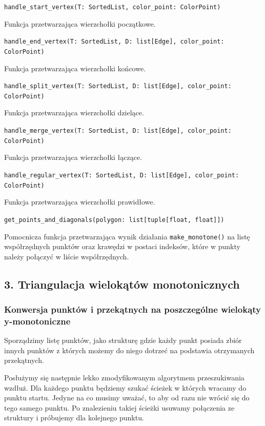 \documentclass[12pt]{article}
\begin{document}
\verb|handle_start_vertex(T: SortedList, color_point: ColorPoint)|

Funkcja przetwarzająca wierzchołki początkowe.
\mbox{}\newline

\verb|handle_end_vertex(T: SortedList, D: list[Edge], color_point: ColorPoint)|

Funkcja przetwarzająca wierzchołki końcowe.
\mbox{}\newline

\verb|handle_split_vertex(T: SortedList, D: list[Edge], color_point: ColorPoint)|

Funkcja przetwarzająca wierzchołki dzielące.
\mbox{}\newline

\verb|handle_merge_vertex(T: SortedList, D: list[Edge], color_point: ColorPoint)|

Funkcja przetwarzająca wierzchołki łączące.
\mbox{}\newline

\verb|handle_regular_vertex(T: SortedList, D: list[Edge], color_point: ColorPoint)|

Funkcja przetwarzająca wierzchołki prawidłowe.
\mbox{}\newline

\verb|get_points_and_diagonals(polygon: list[tuple[float, float]])|

Pomocnicza funkcja przetwarzająca wynik działania \verb|make_monotone()| na listę współrzędnych punktów oraz krawędzi w postaci indeksów, które w punkty należy połączyć w liście współrzędnych.
\mbox{}\newline


\newpage

\subsection*{3. Triangulacja wielokątów monotonicznych}
\subsubsection*{Konwersja punktów i przekątnych na poszczególne wielokąty y-monotoniczne}
Sporządzimy listę punktów, jako strukturę gdzie każdy punkt posiada zbiór innych punktów z których możemy do niego dotrzeć na podstawia otrzymanych przekątnych.

Posłużymy się następnie lekko zmodyfikowanym algorytmem przeszukiwania wzdłuż. Dla każdego punktu będziemy szukać ścieżek w których wracamy do punktu startu. Jedyne na co musimy uważać, to aby od razu nie wrócić się do tego samego punktu. Po znalezieniu takiej ścieżki usuwamy połączenia ze struktury i próbujemy dla kolejnego punktu.
\end{document}
